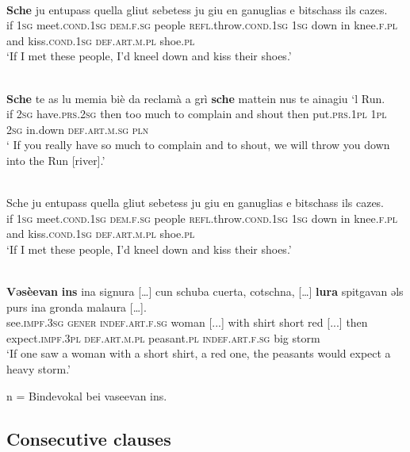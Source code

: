 \ea\label{}
\\
\gll \textbf{Sche} ju entupass quella gliut sebetess ju giu en ganuglias e bitschass ils cazes.\\
     if \textsc{1sg} meet.\textsc{cond.1sg} \textsc{dem.f.sg} people \textsc{refl}.throw.\textsc{cond.1sg} \textsc{1sg} down in knee.\textsc{f.pl} and kiss.\textsc{cond.1sg} \textsc{def.art.m.pl} shoe.\textsc{pl}\\
\glt `If I met these people, I’d kneel down and kiss their shoes.'
\z

\ea\label{}
\\
\gll \textbf{Sche} te as lu memia biè da reclamà a grì \textbf{sche} mattein nus te ainagiu ‘l Run.\\
if \textsc{2sg} have.\textsc{prs.2sg} then too much to complain and shout then put.\textsc{prs.1pl} \textsc{1pl} \textsc{2sg} in.down \textsc{def.art.m.sg} \textsc{pln}\\
     \glt ` If you really have so much to complain and to shout, we will throw you down into the Run [river].'
\z

\ea\label{}
\\
\gll Sche ju entupass quella gliut sebetess ju giu en ganuglias e bitschass ils cazes.\\
     if \textsc{1sg} meet.\textsc{cond.1sg} \textsc{dem.f.sg} people \textsc{refl}.throw.\textsc{cond.1sg} \textsc{1sg} down in knee.\textsc{f.pl} and kiss.\textsc{cond.1sg} \textsc{def.art.m.pl} shoe.\textsc{pl}\\
\glt `If I met these people, I’d kneel down and kiss their shoes.'
\z


\ea\label{}
\\
\gll    \textbf{Vǝsèevan} \textbf{ins} ina signura […] cun schuba cuerta, cotschna, […] \textbf{lura} spitgavan ǝls purs ina gronda malaura […].\\
     see.\textsc{impf.3sg} \textsc{gener} \textsc{indef.art.f.sg} woman [...] with shirt short red [...] then expect.\textsc{impf.3pl} \textsc{def.art.m.pl} peasant.\textsc{pl} \textsc{indef.art.f.sg} big storm\\
\glt `If one saw a woman with a short shirt, a red one, the peasants would expect a heavy storm.'
\z

n = Bindevokal bei vaseevan ins.


\subsection{Consecutive clauses}

